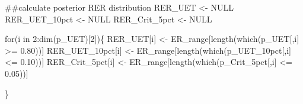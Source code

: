 \documentclass[
  11pt,
]{article}
\newenvironment{Shaded}{}{}
\newcommand{\CommentTok}[1]{\textcolor[rgb]{0.00,0.50,0.00}{#1}}
\newcommand{\ControlFlowTok}[1]{\textcolor[rgb]{0.00,0.00,1.00}{#1}}
\newcommand{\DecValTok}[1]{#1}
\newcommand{\FloatTok}[1]{#1}
\newcommand{\KeywordTok}[1]{\textcolor[rgb]{0.00,0.00,1.00}{#1}}
\newcommand{\NormalTok}[1]{#1}
\newcommand{\OperatorTok}[1]{#1}
\newcommand{\OtherTok}[1]{\textcolor[rgb]{1.00,0.25,0.00}{#1}}
\newcommand{\StringTok}[1]{\textcolor[rgb]{0.00,0.50,0.50}{#1}}
\begin{document}
\begin{Shaded}
\begin{Highlighting}[]
\CommentTok{##calculate posterior RER distribution}
\NormalTok{RER_UET <-}\StringTok{ }\OtherTok{NULL}
\NormalTok{RER_UET_10pct <-}\StringTok{ }\OtherTok{NULL}
\NormalTok{RER_Crit_5pct <-}\StringTok{ }\OtherTok{NULL}

\ControlFlowTok{for}\NormalTok{(i }\ControlFlowTok{in} \DecValTok{2}\OperatorTok{:}\KeywordTok{dim}\NormalTok{(p_UET)[}\DecValTok{2}\NormalTok{])\{}
\NormalTok{  RER_UET[i] <-}\StringTok{ }\NormalTok{ER_range[}\KeywordTok{length}\NormalTok{(}\KeywordTok{which}\NormalTok{(p_UET[,i] }\OperatorTok{>=}\StringTok{ }\FloatTok{0.80}\NormalTok{))]}
\NormalTok{  RER_UET_10pct[i] <-}\StringTok{ }\NormalTok{ER_range[}\KeywordTok{length}\NormalTok{(}\KeywordTok{which}\NormalTok{(p_UET_10pct[,i] }\OperatorTok{<=}\StringTok{ }\FloatTok{0.10}\NormalTok{))]}
\NormalTok{  RER_Crit_5pct[i] <-}\StringTok{ }\NormalTok{ER_range[}\KeywordTok{length}\NormalTok{(}\KeywordTok{which}\NormalTok{(p_Crit_5pct[,i] }\OperatorTok{<=}\StringTok{ }\FloatTok{0.05}\NormalTok{))]}
  
\NormalTok{\}}
\end{Highlighting}
\end{Shaded}
\end{document}
